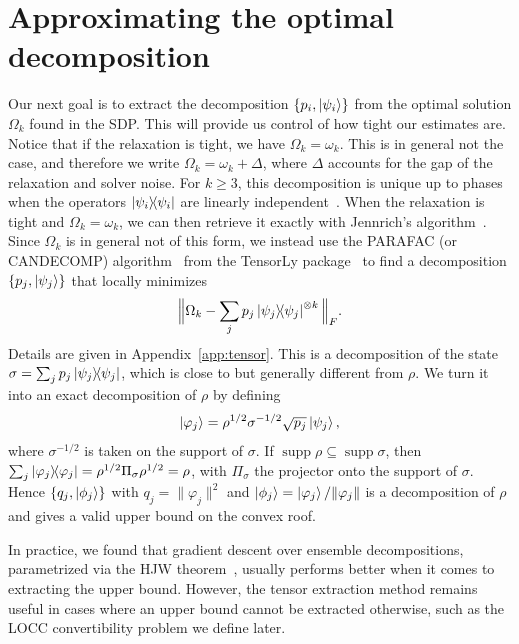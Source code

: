 \documentclass[aps,pra,twocolumn,showpacs,superscriptaddress,groupedaddress]{revtex4-2}
\begin{document}
\section{Approximating the optimal decomposition}\label{sec:extractingTheDecomposition}
Our next goal is to extract the decomposition $\{p_i, \ket{\psi_i}\}$ from the optimal solution $\Omega_k$ found in the SDP. This will provide us control of how tight our estimates are. Notice that if the relaxation is tight, we have $\Omega_k = \omega_k$. This is in general not the case, and therefore we write $\Omega_k = \omega_k + \Delta$, where $\Delta$ accounts for the gap of the relaxation and solver noise.
For $k \geq 3$, this decomposition is unique up to phases when the operators $\dyad{\psi_i}$ are linearly independent~\cite{Kruskal1977}. When the relaxation is tight and $\Omega_k = \omega_k$, we can then retrieve it exactly with Jennrich's algorithm~\cite{Harshman1970,Leurgans1993}. Since $\Omega_k$ is in general not of this form, we instead use the PARAFAC (or CANDECOMP) algorithm~\cite{Harshman1970,CarrollChang1970} from the TensorLy package~\cite{tensorly} to find a decomposition $\{p_j, \ket{\psi_j}\}$ that locally minimizes
\begin{equation}
    \Big\|\Omega_k - \sum_j p_j \dyad{\psi_j}^{\otimes k}\Big\|_F.
\end{equation}
Details are given in Appendix~\ref{app:tensor}.
This is a decomposition of the state $\sigma = \sum_j p_j \dyad{\psi_j}$, which is close to but generally different from $\rho$. We turn it into an exact decomposition of $\rho$ by defining
\begin{equation}
    \ket{\varphi_j} = \rho^{1/2}\sigma^{-1/2}\sqrt{p_j}\ket{\psi_j},
\end{equation}
where $\sigma^{-1/2}$ is taken on the support of $\sigma$. If $\operatorname{supp} \rho \subseteq \operatorname{supp} \sigma$, then $\sum_j \dyad{\varphi_j} = \rho^{1/2}\Pi_\sigma\rho^{1/2} = \rho$, with $\Pi_\sigma$ the projector onto the support of $\sigma$. Hence $\{q_j,\ket{\phi_j}\}$ with $q_j = \|\varphi_j\|^2$ and $\ket{\phi_j}=\ket{\varphi_j}/\|\varphi_j\|$ is a decomposition of $\rho$ and gives a valid upper bound on the convex roof.

In practice, we found that gradient descent over ensemble decompositions, parametrized via the HJW theorem~\cite{HJW}, usually performs better when it comes to extracting the upper bound. However, the tensor extraction method remains useful in cases where an upper bound cannot be extracted otherwise, such as the LOCC convertibility problem we define later.
\end{document}
